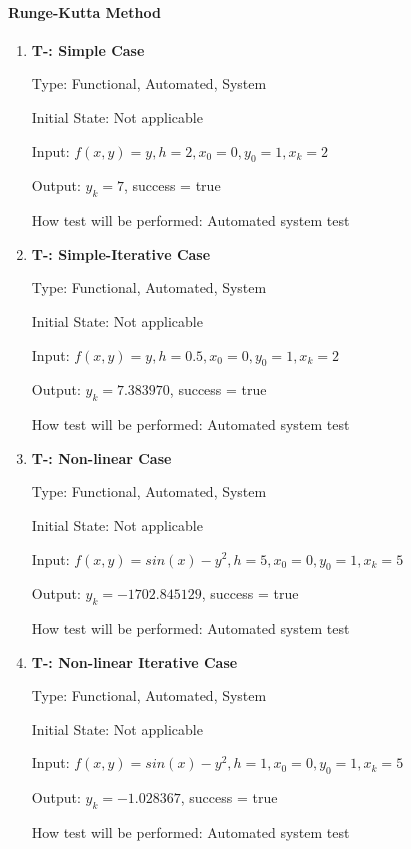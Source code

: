 \documentclass[12pt, titlepage]{article}
\newcounter{tnum} %
\begin{document}
\paragraph{Runge-Kutta Method}
\begin{enumerate}

\item{\textbf{T-\thetnum \label{t-rk_simple}: Simple Case}}

Type: Functional, Automated, System %
					
Initial State: Not applicable
					
Input: $f(x, y) = y, h = 2, x_0 = 0, y_0 = 1, x_k = 2$
					
Output: $y_k = 7$, success = true
					
How test will be performed: Automated system test

\item{\textbf{T-\thetnum \label{t-rk_simpleiterative}: Simple-Iterative Case}}

Type: Functional, Automated, System %
					
Initial State: Not applicable
					
Input: $f(x, y) = y, h = 0.5, x_0 = 0, y_0 = 1, x_k = 2$
					
Output: $y_k = 7.383970$, success = true
					
How test will be performed: Automated system test

\item{\textbf{T-\thetnum \label{t-rk_nonlinear}: Non-linear Case}}

Type: Functional, Automated, System %
					
Initial State: Not applicable
					
Input: $f(x, y) = sin(x) - y^2, h = 5, x_0 = 0, y_0 = 1, x_k = 5$
					
Output: $y_k = -1702.845129$, success = true
					
How test will be performed: Automated system test

\item{\textbf{T-\thetnum \label{t-rk_nonlineariterative}: Non-linear Iterative Case}}

Type: Functional, Automated, System %
					
Initial State: Not applicable
					
Input: $f(x, y) = sin(x) - y^2, h = 1, x_0 = 0, y_0 = 1, x_k = 5$
					
Output: $y_k = -1.028367$, success = true
					
How test will be performed: Automated system test

\end{enumerate}
\end{document}
